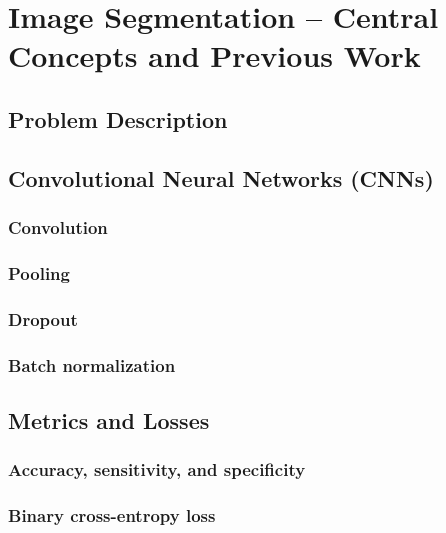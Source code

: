 \section{Image Segmentation -- Central Concepts and Previous Work}


\subsection{Problem Description}
\label{sec:segmentation-description}


\subsection{Convolutional Neural Networks (CNNs)}
\label{sec:cnn}
  \subsubsection{Convolution}
  \subsubsection{Pooling}
  \subsubsection{Dropout}
  \subsubsection{Batch normalization}

\subsection{Metrics and Losses}

\label{sec:segmentation-metrics}
  \subsubsection*{Accuracy, sensitivity, and specificity}
  

  \subsubsection*{Binary cross-entropy loss}
  

